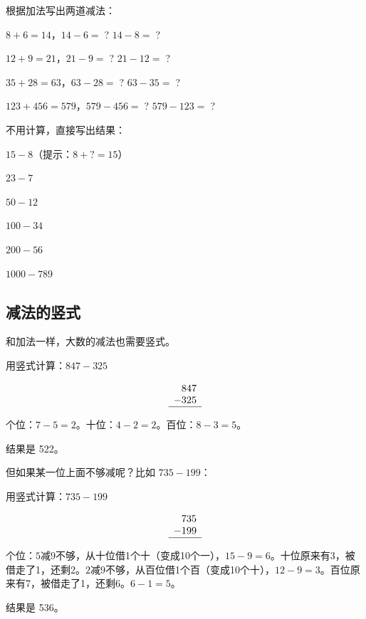 \begin{exercise}
\item 根据加法写出两道减法：
  \begin{subexercise}
    \item $8+6=14$，$14-6=\;$? \quad $14-8=\;$?
    \item $12+9=21$，$21-9=\;$? \quad $21-12=\;$?
    \item $35+28=63$，$63-28=\;$? \quad $63-35=\;$?
    \item $123+456=579$，$579-456=\;$? \quad $579-123=\;$?
  \end{subexercise}

\item 不用计算，直接写出结果：
  \begin{subexercise}
    \item $15-8$（提示：$8+?=15$）
    \item $23-7$
    \item $50-12$
    \item $100-34$
    \item $200-56$
    \item $1000-789$
  \end{subexercise}
\end{exercise}

\subsection*{减法的竖式}

和加法一样，大数的减法也需要竖式。

\begin{example}
用竖式计算：$847-325$
\end{example}
\begin{solution}
\[
\begin{array}{r}
  847 \\
- 325 \\ \hline
\end{array}
\]

个位：$7-5=2$。十位：$4-2=2$。百位：$8-3=5$。

结果是 522。
\end{solution}

但如果某一位上面不够减呢？比如 $735-199$：

\begin{example}
用竖式计算：$735-199$
\end{example}
\begin{solution}
\[
\begin{array}{r}
  735 \\
- 199 \\ \hline
\end{array}
\]

个位：$5$减$9$不够，从十位借1个十（变成10个一），$15-9=6$。十位原来有3，被借走了1，还剩2。$2$减$9$不够，从百位借1个百（变成10个十），$12-9=3$。百位原来有7，被借走了1，还剩6。$6-1=5$。

结果是 536。
\end{solution}

